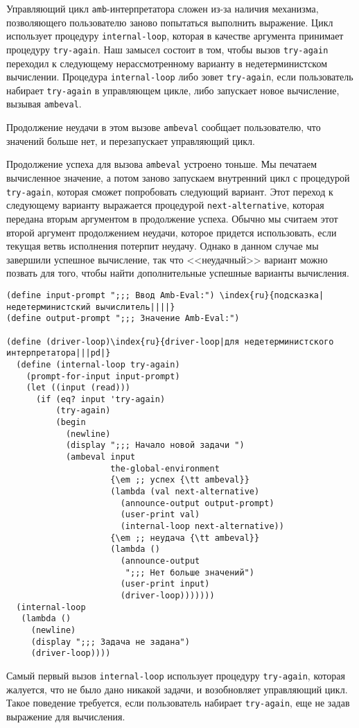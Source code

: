 Управляющий цикл {\tt amb}-интерпретатора сложен
из-за наличия механизма, позволяющего пользователю заново попытаться выполнить
выражение.  Цикл использует процедуру {\tt internal-loop},
которая в качестве аргумента принимает процедуру
{\tt try-again}.  Наш замысел состоит в том, чтобы вызов
{\tt try-again} переходил к следующему нерассмотренному
варианту в недетерминистском вычислении.  Процедура
{\tt internal-loop} либо зовет {\tt try-again}, если
пользователь набирает {\tt try-again} в управляющем цикле, либо
запускает новое вычисление, вызывая {\tt ambeval}.

Продолжение неудачи в этом вызове {\tt ambeval}
сообщает пользователю, что значений больше нет, и перезапускает
управляющий цикл.

Продолжение успеха для вызова {\tt ambeval}
устроено тоньше.  Мы печатаем вычисленное значение, а потом заново
запускаем внутренний цикл с процедурой {\tt try-again},
которая сможет попробовать следующий вариант.  Этот переход к
следующему варианту выражается процедурой
{\tt next-alternative}, которая передана вторым аргументом в
продолжение успеха.  Обычно мы считаем этот второй аргумент
продолжением неудачи, которое придется использовать, если текущая ветвь
исполнения потерпит неудачу.  Однако в данном случае мы завершили
успешное вычисление, так что <<неудачный>> вариант можно позвать
для того, чтобы найти дополнительные успешные варианты вычисления.

\begin{Verbatim}[fontsize=\small]
(define input-prompt ";;; Ввод Amb-Eval:") \index{ru}{подсказка|недетерминистский вычислитель||||}
(define output-prompt ";;; Значение Amb-Eval:")

(define (driver-loop)\index{ru}{driver-loop|для недетерминистского интерпретатора|||pd|}
  (define (internal-loop try-again)
    (prompt-for-input input-prompt)
    (let ((input (read)))
      (if (eq? input 'try-again)
          (try-again)
          (begin
            (newline)
            (display ";;; Начало новой задачи ")
            (ambeval input
                     the-global-environment
                     {\em ;; успех {\tt ambeval}}
                     (lambda (val next-alternative)
                       (announce-output output-prompt)
                       (user-print val)
                       (internal-loop next-alternative))
                     {\em ;; неудача {\tt ambeval}}
                     (lambda ()
                       (announce-output
                        ";;; Нет больше значений")
                       (user-print input)
                       (driver-loop)))))))
  (internal-loop
   (lambda ()
     (newline)
     (display ";;; Задача не задана")
     (driver-loop))))
\end{Verbatim}
Самый первый вызов {\tt internal-loop} использует процедуру
{\tt try-again}, которая жалуется, что не было
дано никакой задачи, и возобновляет управляющий цикл.  Такое поведение
требуется, если пользователь набирает {\tt try-again}, еще не задав
выражение для вычисления.

